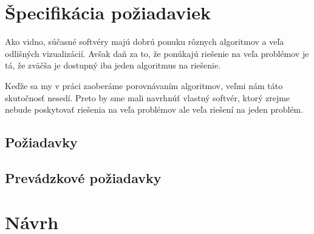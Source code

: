 \section{Špecifikácia požiadaviek}

Ako vidno, súčasné softvéry majú dobrú ponuku rôznych algoritmov a veľa 
odlišných vizualizácií. Avšak daň za to, že ponúkajú riešenie na veľa problémov 
je tá, že zväčša je dostupný iba jeden algoritmus na riešenie.

Keďže sa my v práci zaoberáme porovnávaním algoritmov, veľmi nám táto 
skutočnosť nesedí. Preto by sme mali navrhnúť vlastný softvér, ktorý zrejme 
nebude poskytovať riešenia na veľa problémov ale veľa riešení na jeden problém.


\subsection{Požiadavky}


\subsection{Prevádzkové požiadavky}



\section{Návrh}

